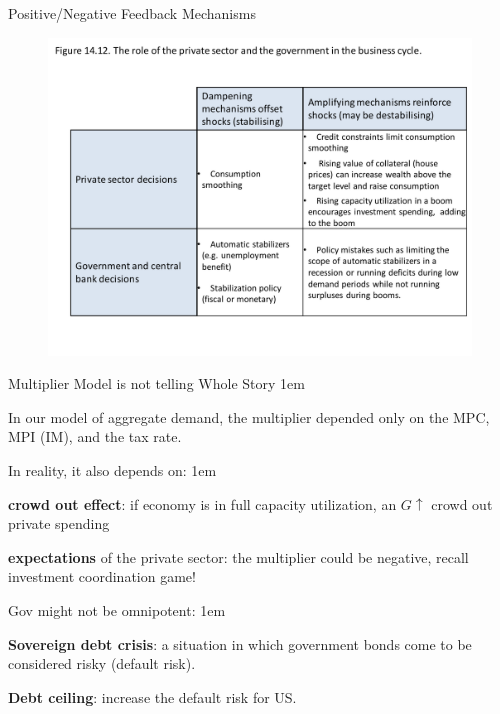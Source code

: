 \documentclass[11pt,aspectratio=43,usenames,dvipsnames]{beamer}
\let\olditemize=\itemize
\let\endolditemize=\enditemize
\renewenvironment{itemize}{\olditemize \itemsep1em}{\endolditemize}
\theoremstyle{definition}
\begin{document}
\begin{frame}{Positive/Negative Feedback Mechanisms}
\label{slide:Positive_Negative_Feedback_Mechanisms}
    \begin{figure}
        \centering
        \includegraphics[width=\textwidth]{./figures/16.pdf}
    \end{figure}

\end{frame}

\begin{frame}{Multiplier Model is not telling Whole Story}
\label{slide:Multiplier_Model_is_not_telling_Whole_Story}
    \begin{itemize}
        \item In our model of aggregate demand, the multiplier depended only on the MPC, MPI (IM), and the tax rate.
        \item In reality, it also depends on:
        \begin{itemize}
            \item \textbf{crowd out effect}: if economy is in full capacity utilization, an $ G \uparrow  $ crowd out private spending
            \item \textbf{expectations} of the private sector: the multiplier could be \alert{negative}, recall investment coordination game!
        \end{itemize}
        \item Gov might not be omnipotent:
        \begin{itemize}
            \item \textbf{Sovereign debt crisis}: a situation in which government bonds come to be considered risky (default risk).
            \item \textbf{Debt ceiling}: increase the default risk for US.
        \end{itemize}


    \end{itemize}



\end{frame}
\end{document}
